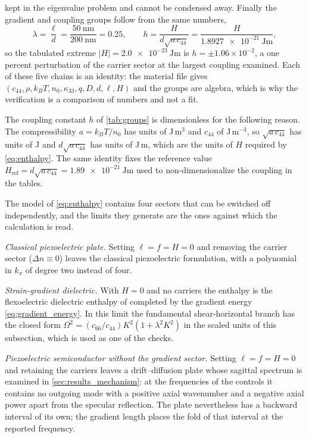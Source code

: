 kept in the eigenvalue problem and cannot be condensed away.  Finally the
gradient and coupling groups follow from the same numbers,
\begin{equation}
\label{eq:lam_worked}
\lambda=\frac{\ell}{d}=\frac{\SI{50}{\nano\metre}}{\SI{200}{\nano\metre}}=0.25 ,
\qquad
h=\frac{H}{d\sqrt{a\,c_{44}}}=\frac{H}{\SI{1.8927e-21}{\joule\metre}} ,
\end{equation}
so the tabulated extreme $|H|=\SI{2.0e-23}{\joule\metre}$ is
$h=\pm1.06\times10^{-2}$, a one percent perturbation of the carrier sector at
the largest coupling examined.  Each of these five chains is an identity: the material file gives $(c_{44},\rho,k_BT,n_0,\kappa_{33},q,D,d,\ell,H)$ and the
groups are algebra, which is why the verification is a comparison of numbers and not a fit.

The coupling constant $h$ of \cref{tab:groups} is dimensionless for the
following reason.  The compressibility $a=k_BT/n_0$ has units of J\,m$^3$ and
$c_{44}$ of J\,m$^{-3}$, so $\sqrt{a\,c_{44}}$ has units of J and
$d\sqrt{a\,c_{44}}$ has units of J\,m, which are the units of $H$ required by
\eqref{eq:enthalpy}.  The same identity fixes the reference value
$H_{\mathrm{ref}}=d\sqrt{a\,c_{44}}=\SI{1.89e-21}{\joule\metre}$ used to
non-dimensionalize the coupling in the tables.


The model of \eqref{eq:enthalpy} contains four sectors that can be switched off
independently, and the limits they generate are the ones against which the
calculation is read.

\emph{Classical piezoelectric plate.}  Setting $\ell=f=H=0$ and removing the
carrier sector ($\Delta n\equiv0$) leaves the classical piezoelectric
formulation, with a polynomial in $k_x$ of degree two instead of four.

\emph{Strain-gradient dielectric.}  With $H=0$ and no carriers the enthalpy is
the flexoelectric dielectric enthalpy of \cite{shen2010theory} completed by the
gradient energy \eqref{eq:gradient_energy}.  In this limit the fundamental
shear-horizontal branch has the closed form
$\Omega^{2}=(c_{66}/c_{44})K^{2}(1+\lambda^{2}K^{2})$ in the scaled units of this subsection, which is used as one of the checks.

\emph{Piezoelectric semiconductor without the gradient sector.}  Setting
$\ell=f=H=0$ and retaining the carriers leaves a drift--diffusion plate whose
sagittal spectrum is examined in \cref{sec:results_mechanism}: at the frequencies of the controls it
contains no outgoing mode with a positive axial wavenumber and a negative axial
power apart from the specular reflection.  The plate nevertheless has a backward
interval of its own; the gradient length places the fold of that interval at the
reported frequency.

